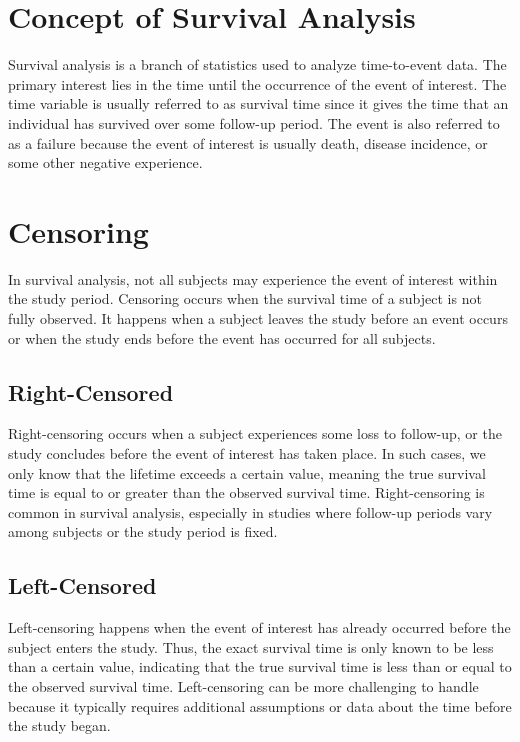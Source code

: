 \documentclass[doublespacing,12pt]{report}
\begin{document}
\section{Concept of Survival Analysis}

Survival analysis is a branch of statistics used to analyze time-to-event data. The primary interest lies in the time until the occurrence of the event of interest.  The time variable is usually referred to as survival time since it gives the time that an individual has survived over some follow-up period. The event is also referred to as a failure because the event of interest is usually death, disease incidence, or some other negative experience. 


\section{Censoring}

In survival analysis, not all subjects may experience the event of interest within the study period. Censoring occurs when the survival time of a subject is not fully observed. It happens when a subject leaves the study before an event occurs or when the study ends before the event has occurred for all subjects.

\subsection{Right-Censored}

Right-censoring occurs when a subject experiences some loss to follow-up, or the study concludes before the event of interest has taken place. In such cases, we only know that the lifetime exceeds a certain value, meaning the true survival time is equal to or greater than the observed survival time. Right-censoring is common in survival analysis, especially in studies where follow-up periods vary among subjects or the study period is fixed.

\subsection{Left-Censored}

Left-censoring happens when the event of interest has already occurred before the subject enters the study. Thus, the exact survival time is only known to be less than a certain value, indicating that the true survival time is less than or equal to the observed survival time. Left-censoring can be more challenging to handle because it typically requires additional assumptions or data about the time before the study began.
\end{document}
